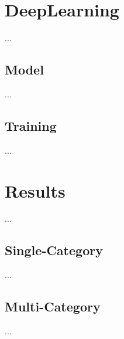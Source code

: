 \documentclass[11pt,a4paper]{article}
\begin{document}
\section{DeepLearning}

...


\subsection{Model}

...


\subsection{Training}

...


\section{Results}

...


\subsection{Single-Category}

...


\subsection{Multi-Category}

...




\end{document}
